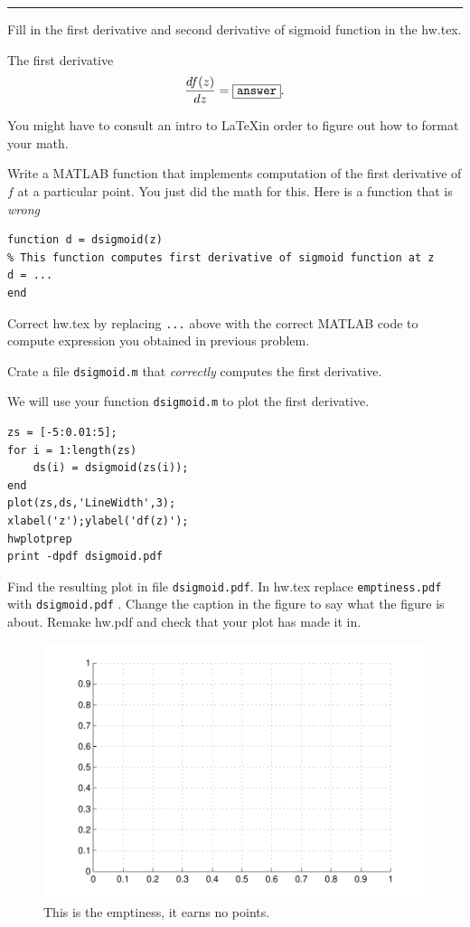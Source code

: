 \documentclass{article}
\begin{document}
\hrule

\newproblem{0.5pt}
Fill in the first derivative and second derivative of sigmoid function in the hw\theHW.tex.

The first derivative
\[
\frac{d f(z)}{dz} =  \answer.%
\]

You might have to consult an intro to \LaTeX in order to figure out how to format your math.

\newproblem{0.5pt}
Write a MATLAB function that implements computation  of the first derivative of $f$ at a particular point. You just did the math for this.
Here is a function that is {\em wrong}
\begin{verbatim}
function d = dsigmoid(z)
% This function computes first derivative of sigmoid function at z
d = ...
end
\end{verbatim}
Correct hw\theHW.tex by replacing {\tt ...} above with the correct MATLAB code to compute expression you obtained in previous problem.

Crate a file {\tt dsigmoid.m} that {\em correctly} computes the first derivative.

\newproblem{0.5pt}

We will use your function {\tt dsigmoid.m} to plot the first derivative.
\begin{verbatim}
zs = [-5:0.01:5];
for i = 1:length(zs)
    ds(i) = dsigmoid(zs(i));
end
plot(zs,ds,'LineWidth',3);
xlabel('z');ylabel('df(z)');
hwplotprep
print -dpdf dsigmoid.pdf
\end{verbatim}

Find the resulting plot in file {\tt dsigmoid.pdf}. In hw\theHW.tex replace {\tt emptiness.pdf} with {\tt dsigmoid.pdf} . Change the
caption in the figure to say what the figure is about. Remake hw\theHW.pdf and check that your plot has made it in.
\begin{figure}[H]
\begin{center}
\includegraphics[scale=0.5]{emptiness.pdf}
\caption{This is the emptiness, it earns no points.}
\end{center}
\end{figure}
\end{document}
